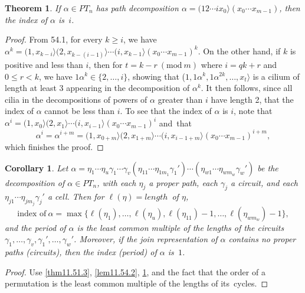 \documentclass{surv-l}
\numberwithin{equation}{section}
\numberwithin{table}{section}
\numberwithin{figure}{section}
\theoremstyle{plain}
\newtheorem{theorem}[equation]{Theorem}
\newtheorem{corollary}[equation]{Corollary}
\theoremstyle{definition}
\begin{document}
\begin{theorem}\label{thm11.54.3}
If $\alpha\in PT_{n}$ has path decomposition $\alpha=(12\cdots
ix_{0}\rangle(x_{0}\cdots x_{m-1})$, then the index of $\alpha$
is~$i$.
\end{theorem}

\begin{proof} From 54.1, for every $k\geq i$, we have $\alpha^{k}=(1,
x_{k-i}\rangle(2,x_{k-(i-1)}\rangle\cdots (i,x_{k-1}\rangle
(x_{0}\cdots x_{m-1})^{k}$. On the other hand, if $k$ is positive
and less than $i$, then for $t= k-r\ (\mathrm{mod}\ m)$ where
$i=qk+r$ and $0\leq r<k$, we have $1\alpha^{k}\in\{2,\ldots, i\}$,
showing that ($1,1\alpha^{k}, 1\alpha^{2k},\ldots, x_{t}\rangle$
is a cilium of length at least 3 appearing in the decomposition of
$\alpha^{k}$. It then follows, since all cilia in the
decompositions of powers of $\alpha$ greater than $i$ have length
2, that the index of $\alpha$ cannot be less than $i$. To see that
the index of $\alpha$ is $i$, note that $\alpha^{i}=(1,
x_{0}\rangle(2, x_{1}\rangle\cdots(i, x_{i-1}\rangle(x_{0}\cdots
x_{m-1})^{i}$ and~that
\[
\alpha^{i}=\alpha^{i+m}=(1, x_{0+m}\rangle(2,x_{1+m}\rangle\cdots
(i, x_{i-1+m}\rangle (x_{0}\cdots x_{m-1})^{i+m},
\]
which finishes the proof.
\end{proof}

\setcounter{equation}{4}
\begin{corollary}\label{cor11.54.5}
Let
$\alpha=\eta_{1}\cdots\eta_{u}\gamma_{1}\cdots\gamma_{v}(\eta_{11}
\cdots\eta_{1m_{1}}\gamma_{1}')\cdots(\eta_{w1}\cdots\eta_{wm_{w}}\gamma_{w}')$
be the decomposition of $\alpha\in PT_{n}$, with each $\eta_{j}$ a
proper path, each $\gamma_{j}$ a circuit, and each
$\eta_{j1}\cdots\eta_{jm_{j}}\gamma_{j}'$ a cell. Then for
$\ell(\eta)= length$~of $\eta$,
\[
\text{index\ of}\ \alpha=\max\{\ell(\eta_{1}),\ldots,
\ell(\eta_{u}), \ell(\eta_{11})-1,\ldots, \ell(\eta_{wm_{w}})-1\},
\]
and the period of $\alpha$ is the least common multiple of the
lengths of the circuits $\gamma_{1},\ldots, \gamma_{v},
\gamma_{1}',\ldots, \gamma_{w}'$. Moreover, if the join
representation of $\alpha$ contains no proper paths (circuits),
then the index (period) of
$\alpha$ is~$1$.
\end{corollary}

\begin{proof} Use \ref{thm11.51.3}, \ref{lem11.54.2}, \ref{thm11.54.3}, and the fact that the order of a
permutation is the least common multiple of the lengths of
its~cycles.
\end{proof}
\end{document}
